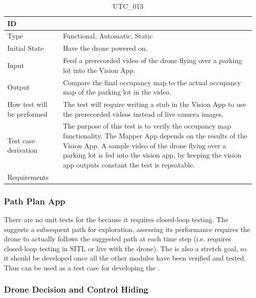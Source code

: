 \documentclass[12pt, titlepage]{article}
\begin{document}
\begin{table}[!h]
\begin{center}
\caption {UTC\_013}
\label{tab:UTC_013}
\begin{tabular}{ | m{3.2cm} | m{12.2cm} | } 
\hline
ID & \nameref{tab:UTC_013} \\ 
\hline
Type &  Functional, Automatic, Static  \\ 
\hline
Initial State & Have the drone powered on. \\ 
\hline
Input & Feed a prerecorded video of the drone flying over a parking lot into the Vision App.  \\ 
\hline
Output &  Compare the final occupancy map to the actual occupancy map of the parking lot in the video. \\ 
\hline
How test will be performed &  The test will require writing a stub in the Vision App to use the prerecorded videos instead of live camera images.\\ 
\hline
Test case derivation &  The purpose of this test is to verify the occupancy map functionality. The Mapper App depends on the results of the Vision App. A sample video of the drone flying over a parking lot is fed into the vision app, by keeping the vision app outputs constant the test is repeatable. \\ 
\hline
Requirements &  \\ 
\hline
\end{tabular}
\end{center}
\end{table}



\subsubsection{Path Plan App}
There are no unit tests for the  because it requires closed-loop testing. The  suggests a subsequent path for exploration, assessing its performance requires the drone  to actually follows the suggested path at each time step (i.e. requires closed-loop testing in SITL or live with the drone). The  is also a stretch goal, so it should be developed once all the other modules have been verified and tested. Thus  can be used as a test case for developing the . 



\subsubsection{Drone Decision and Control Hiding}
\end{document}
